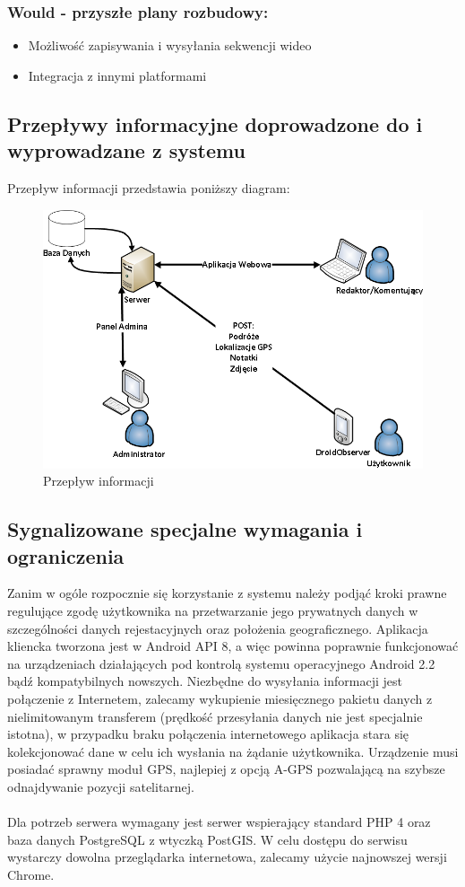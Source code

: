 \documentclass[11pt,a4paper]{article}
\begin{document}
\subsubsection{Would - przyszłe plany rozbudowy:}
\begin{itemize}
\item Możliwość zapisywania i wysyłania sekwencji wideo
\item Integracja z innymi platformami
\end{itemize}

\subsection {Przepływy informacyjne doprowadzone do i wyprowadzane z systemu}
Przepływ informacji przedstawia poniższy diagram:\\
  \begin{figure}[h]
    \includegraphics[scale=0.5]{data_flow.png}
    \caption{Przepływ informacji}
  \end{figure}

\subsection {Sygnalizowane specjalne wymagania i ograniczenia}
Zanim w ogóle rozpocznie się korzystanie z systemu należy podjąć kroki prawne regulujące zgodę użytkownika na przetwarzanie jego prywatnych danych w szczególności danych rejestacyjnych oraz położenia geograficznego. Aplikacja kliencka tworzona jest w Android API 8, a więc powinna poprawnie funkcjonować na urządzeniach działających pod kontrolą systemu operacyjnego Android 2.2 bądź kompatybilnych nowszych. Niezbędne do wysyłania informacji jest połączenie z Internetem, zalecamy wykupienie miesięcznego pakietu danych z nielimitowanym transferem (prędkość przesyłania danych nie jest specjalnie istotna), w przypadku braku połączenia internetowego aplikacja stara się kolekcjonować dane w celu ich wysłania na żądanie użytkownika. Urządzenie musi posiadać sprawny moduł GPS, najlepiej z opcją A-GPS pozwalającą na szybsze odnajdywanie pozycji satelitarnej.\\
\\
Dla potrzeb serwera wymagany jest serwer wspierający standard PHP 4 oraz baza danych PostgreSQL z wtyczką PostGIS. W celu dostępu do serwisu wystarczy dowolna przeglądarka internetowa, zalecamy użycie najnowszej wersji Chrome.
\end{document}
